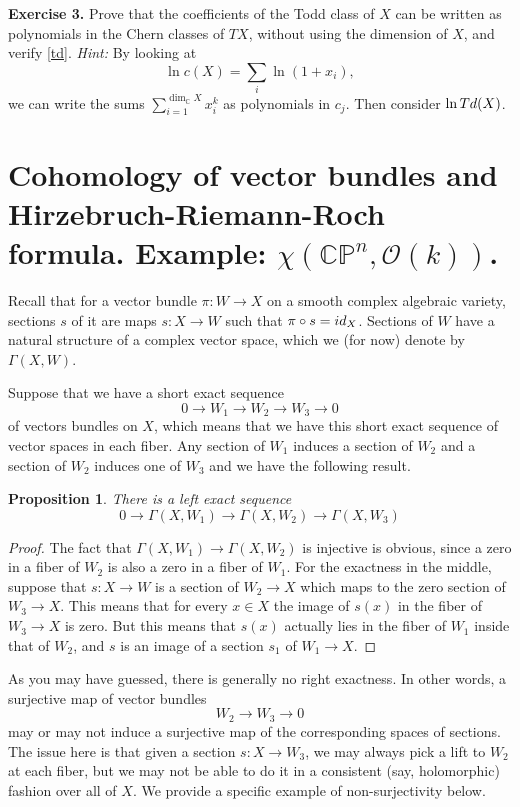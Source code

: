 \documentclass[11pt]{article}
\numberwithin{equation}{section}
\numberwithin{footnote}{section}
\newtheorem{prop}[thm]{Proposition}
\newcommand{\blue}{\color{blue}}
\renewcommand{\P}{{\mathbb P}}
\newcommand{\C}{{\mathbb C}}
\begin{document}
{\bf Exercise 3.} Prove that the coefficients of the Todd class of $X$ can be written as polynomials in the Chern classes of $TX$, without using the dimension of $X$, and verify \eqref{td}. \emph{Hint:} By looking at 
$$\ln c(X) = \sum_i \ln(1+x_i),$$
we can write the sums $\sum_{i=1}^{\dim_\C X} x_i^k$ as polynomials in $c_j$. Then consider $\ln {\rm Td}(X)$.


\section{Cohomology of vector bundles and Hirzebruch-Riemann-Roch formula. 
Example: $\chi(\C\P^n,\mathcal O(k))$.}
Recall that for a  vector bundle $\pi:W\to X$ on a smooth complex algebraic variety, sections $s$ of it are  maps $s:X\to W$ such that $\pi \circ s = {\rm id}_X$. Sections of $W$ have a natural structure of a complex vector space, which we (for now) denote by $\Gamma(X,W)$.  

\smallskip
Suppose that we have a short exact sequence 
$$
0\to W_1 \to W_2 \to W_3 \to 0
$$
of vectors bundles on $X$, which means that we have this short exact sequence of vector spaces in each fiber.
Any section of $W_1$ induces a section of $W_2$ and a section of $W_2$ induces one of $W_3$
 and we have the following result.
\smallskip
\begin{prop}\label{lex}
There is a left exact sequence
$$
0\to \Gamma(X,W_1)
\to \Gamma(X,W_2)
\to \Gamma(X,W_3)
$$
\end{prop}

\begin{proof}
The fact that $\Gamma(X,W_1)
\to \Gamma(X,W_2)$ is injective is obvious, since a zero in a fiber of $W_2$ is also a zero in a fiber of $W_1$.
For the exactness in the middle, suppose that $s:X\to W$ is a section of $W_2\to X$ which maps to the zero section
of $W_3\to X$. This means that for every $x\in X$ the image of $s(x)$ in the fiber of $W_3\to X$ is zero. But this means that $s(x)$ actually lies in the fiber of $W_1$ inside that of $W_2$, and $s$ is an image of a section $s_1$ of $W_1\to X$. 
\end{proof}


\smallskip
As you may have guessed, there is generally {\blue no right exactness}. In other words, a surjective map of vector bundles
$$W_2\to W_3\to 0$$
may or may not induce a surjective map of the corresponding spaces of sections. The issue here is that given a section $s:X\to W_3$, we may always pick a lift to $W_2$ at each fiber, but we may not be able to do it in a consistent (say, holomorphic) fashion over all of $X$.
We provide a specific example of non-surjectivity below.
\end{document}
